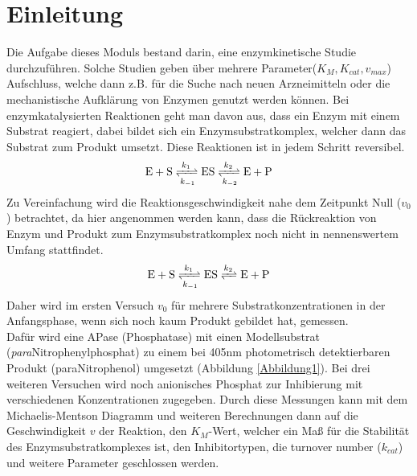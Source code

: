 \section{Einleitung}

Die Aufgabe dieses Moduls bestand darin, eine enzymkinetische Studie durchzuführen. Solche Studien geben über mehrere Parameter($K_M, K_{cat}, v_{max}$) Aufschluss, welche dann z.B. für die Suche nach neuen Arzneimitteln oder die mechanistische Aufklärung von Enzymen genutzt werden können. Bei enzymkatalysierten Reaktionen geht man davon aus, dass ein Enzym mit einem Substrat reagiert, dabei bildet sich ein Enzymsubstratkomplex, welcher dann das Substrat zum Produkt umsetzt. Diese Reaktionen ist in jedem Schritt reversibel. 
 \begin{align}
    \mathrm{E} + \mathrm{S} \xrightleftharpoons[k_{-1}]{k_1} \mathrm{ES}
    \xrightleftharpoons[k_{-2}]{k_2} \mathrm{E} + \mathrm{P}
 \end{align}
 Zu Vereinfachung wird die Reaktionsgeschwindigkeit nahe dem Zeitpunkt Null ($v_0$) betrachtet, da hier angenommen werden kann, dass die Rückreaktion von Enzym und Produkt zum Enzymsubstratkomplex noch nicht in nennenswertem Umfang stattfindet.  
 \begin{align}
    \mathrm{E} + \mathrm{S} \xrightleftharpoons[k_{-1}]{k_1} \mathrm{ES}
    \xrightleftharpoons{k_2} \mathrm{E} + \mathrm{P}
 \end{align}
 Daher wird im ersten Versuch $v_0$ für mehrere Substratkonzentrationen in der Anfangsphase, wenn sich noch kaum Produkt gebildet hat, gemessen. \\
 Dafür wird eine APase (Phosphatase) mit einen Modellsubstrat (\textit{para}Nitrophenylphosphat) zu einem bei 405nm photometrisch detektierbaren Produkt (paraNitrophenol) umgesetzt (Abbildung \ref{Abbildung1}).
 Bei drei weiteren Versuchen wird noch anionisches Phosphat zur Inhibierung mit verschiedenen Konzentrationen zugegeben. Durch diese Messungen kann mit dem Michaelis-Mentson Diagramm und weiteren Berechnungen dann auf die Geschwindigkeit $v$ der Reaktion, den $K_M$-Wert, welcher ein Maß für die Stabilität des Enzymsubstratkomplexes ist, den Inhibitortypen, die turnover number ($k_{cat}$) und weitere Parameter geschlossen werden.
  
